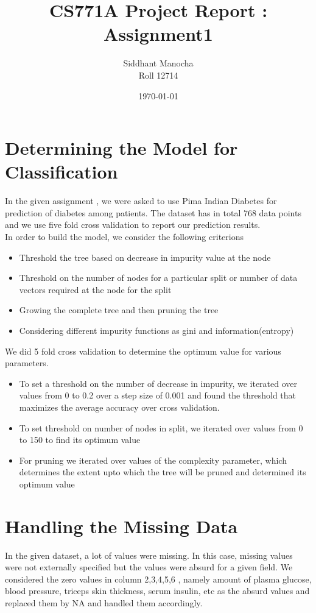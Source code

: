 \documentclass[a4paper]{article}
\title{CS771A Project Report : Assignment1  }
\author{ \hspace{0.1cm}Siddhant Manocha \\
        Roll 12714 \\
        }
\date {\today}
\begin{document}
\maketitle


\section{Determining the Model for Classification}
In the given assignment , we were asked to use Pima Indian Diabetes for prediction of diabetes among patients. The dataset has in total 768 data points and we use five fold cross validation to report our prediction results.
\\
In order to build the model, we consider the following criterions \\
\begin{itemize}
\item Threshold the tree based on decrease in impurity value at the node
\item Threshold on the number of nodes for a particular split or number of data vectors required at the node for the split
\item Growing the complete tree and then pruning the tree
\item Considering different impurity functions as gini and information(entropy)
\end{itemize} 

We did 5 fold cross validation to determine the optimum value for various parameters.
\begin{itemize}
\item To set a threshold on the number of decrease in impurity, we iterated over values from 0 to 0.2 over a step size of 0.001 and found the threshold that maximizes the average accuracy over cross validation.
\item To set threshold on number of nodes in split, we iterated over values from 0 to 150 to find its optimum value
\item For pruning we iterated over values of the complexity parameter, which determines the extent upto which the tree will be pruned and determined its optimum value
\end{itemize} 


\section{Handling the Missing Data}
In the given dataset, a lot of values were missing. In this case, missing values were not externally specified but the values were absurd for a given field.
We considered the zero values in column 2,3,4,5,6 , namely amount of plasma glucose, blood pressure, triceps skin thickness, serum insulin, etc as the absurd values and replaced them by NA and handled them accordingly.
\end{document}
